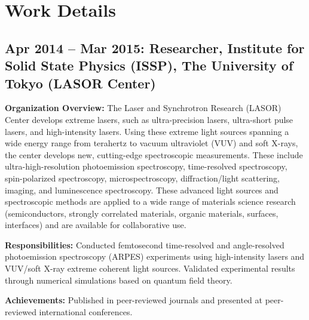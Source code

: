 \documentclass[uplatex,a4j,10.5pt,dvipdfmx]{jsarticle}
\newcommand{\textbfsubsection}[1]{\subsection*{\textbf{#1}}}
\begin{document}
\section*{Work Details}

\textbfsubsection{Apr 2014 -- Mar 2015: Researcher, Institute for Solid State Physics (ISSP), The University of Tokyo (LASOR Center)}

\noindent\textbf{Organization Overview:} The Laser and Synchrotron Research (LASOR) Center develops extreme lasers, such as ultra-precision lasers, ultra-short pulse lasers, and high-intensity lasers. Using these extreme light sources spanning a wide energy range from terahertz to vacuum ultraviolet (VUV) and soft X-rays, the center develops new, cutting-edge spectroscopic measurements. These include ultra-high-resolution photoemission spectroscopy, time-resolved spectroscopy, spin-polarized spectroscopy, microspectroscopy, diffraction/light scattering, imaging, and luminescence spectroscopy. These advanced light sources and spectroscopic methods are applied to a wide range of materials science research (semiconductors, strongly correlated materials, organic materials, surfaces, interfaces) and are available for collaborative use.

\noindent\textbf{Responsibilities:} Conducted femtosecond time-resolved and angle-resolved photoemission spectroscopy (ARPES) experiments using high-intensity lasers and VUV/soft X-ray extreme coherent light sources. Validated experimental results through numerical simulations based on quantum field theory.

\noindent\textbf{Achievements:} Published in peer-reviewed journals and presented at peer-reviewed international conferences.
\end{document}
